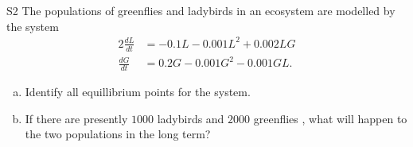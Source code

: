 \begin{problem}{S2}
The populations of greenflies and ladybirds in an ecosystem are modelled by the system
\begin{alignat*}{2}
\frac{dL}{dt} &= -0.1L - 0.001L^2 + 0.002LG \\
\frac{dG}{dt} & = 0.2G - 0.001G^2 - 0.001GL.
\end{alignat*}
\begin{enumerate}[(a)]
\item Identify all equillibrium points for the system.
\item If there are presently \(1000\) ladybirds and \(2000\) greenflies , what will happen to the two populations in the long term?
\end{enumerate}
\end{problem}
